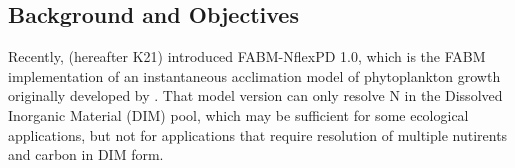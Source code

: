 \documentclass[gmd, manuscript, draft]{copernicus}
\begin{document}
\introduction%


\subsection{Background and Objectives}
Recently, \citet{Kerimoglu2021} (hereafter K21) introduced FABM-NflexPD 1.0, which is the FABM \citep[Framework for Aquatic Biogeochemical Models][]{Bruggeman2014} implementation of an instantaneous acclimation model of phytoplankton growth originally developed by \citet{Smith2016}. That model version can only resolve N in the Dissolved Inorganic Material (DIM) pool, which may be sufficient for some ecological applications, %
but not for applications that require resolution of multiple nutirents and carbon in DIM form.
\end{document}
